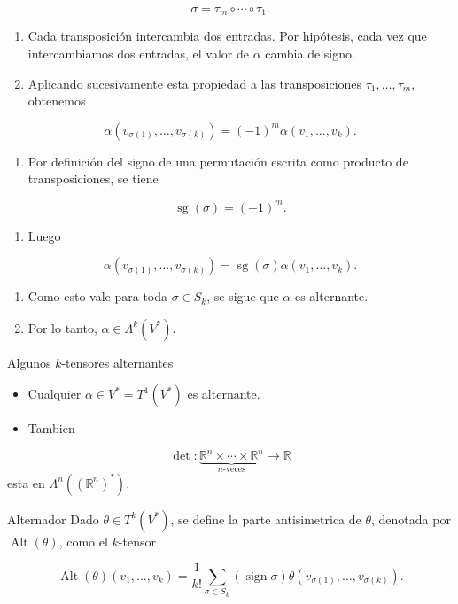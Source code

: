 \begin{bookproof}{}
\begin{enumerate}[start=11]
\end{enumerate}
\[
\sigma=\tau_m\circ\cdots\circ\tau_1.
\]
\begin{enumerate}[start=12]
\item Cada transposición intercambia dos entradas. Por hipótesis, cada vez que intercambiamos dos entradas, el valor de $\alpha$ cambia de signo.
\item Aplicando sucesivamente esta propiedad a las transposiciones $\tau_1,\dots,\tau_m$, obtenemos
\end{enumerate}
\[
\alpha(v_{\sigma(1)},\dots,v_{\sigma(k)})=(-1)^m\alpha(v_1,\dots,v_k).
\]
\begin{enumerate}[start=14]
\item Por definición del signo de una permutación escrita como producto de transposiciones, se tiene
\end{enumerate}
\[
\operatorname{sg}(\sigma)=(-1)^m.
\]
\begin{enumerate}[start=15]
\item Luego
\end{enumerate}
\[
\alpha(v_{\sigma(1)},\dots,v_{\sigma(k)})=\operatorname{sg}(\sigma)\alpha(v_1,\dots,v_k).
\]
\begin{enumerate}[start=16]
\item Como esto vale para toda $\sigma\in S_k$, se sigue que $\alpha$ es alternante.
\item Por lo tanto, $\alpha\in\Lambda^k(V^*)$.
\end{enumerate}
\bookqed
\end{bookproof}
\begin{bookexample}{Algunos $k$-tensores alternantes}
\begin{itemize}
\item Cualquier $\alpha\in V^*=T^1(V^*)$ es alternante.
\item Tambien
\end{itemize}
\[
\det:\underbrace{\mathbb R^n\times\cdots\times\mathbb R^n}_{n\text{-veces}}\to\mathbb R
\]
esta en $\Lambda^n((\mathbb R^n)^*)$.

\end{bookexample}
\begin{bookdefinition}{Alternador}
Dado $\theta\in T^k(V^*)$, se define la parte antisimetrica de $\theta$, denotada por $\operatorname{Alt}(\theta)$, como el $k$-tensor

\[
\operatorname{Alt}(\theta)(v_1,\ldots,v_k)=\frac1{k!}\sum_{\sigma\in S_k}(\operatorname{sign}\sigma)\theta(v_{\sigma(1)},\ldots,v_{\sigma(k)}).
\]
\end{bookdefinition}
